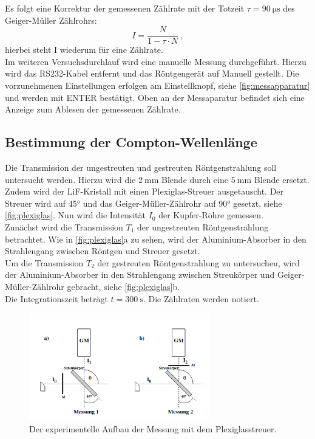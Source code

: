 \noindent Es folgt eine Korrektur der gemessenen Zählrate mit der Totzeit $\tau = \SI{90}{\micro\second}$ des Geiger-Müller Zählrohrs:
\begin{equation}\label{eqn:korrektur}
    I = \frac{N}{1 - \tau \cdot N} \, ,
\end{equation}
hierbei steht I wiederum für eine Zählrate.\\

\noindent
Im weiteren Versuchsdurchlauf wird eine manuelle Messung durchgeführt.
Hierzu wird das RS232-Kabel entfernt und das Röntgengerät auf Manuell gestellt.
Die vorzunehmenen Einstellungen erfolgen am Einstellknopf, siehe \autoref{fig:messapparatur} und werden mit ENTER bestätigt.
Oben an der Messaparatur befindet sich eine Anzeige zum Ablesen der gemessenen Zählrate.

\subsection{Bestimmung der Compton-Wellenlänge}
Die Transmission der ungestreuten und gestreuten Röntgenstrahlung soll untersucht werden.
Hierzu wird die $\SI{2}{\milli\metre}$ Blende durch eine $\SI{5}{\milli\metre}$ Blende ersetzt.
Zudem wird der LiF-Kristall mit einen Plexiglas-Streuer ausgetauscht.
Der Streuer wird auf 45° und das Geiger-Müller-Zählrohr auf 90° gesetzt, siehe \autoref{fig:plexiglas}.
Nun wird die Intensität $I_0$ der Kupfer-Röhre gemessen. \\
\noindent
Zunächst wird die Transmission $T_1$ der ungestreuten Röntgenstrahlung betrachtet.
Wie in \autoref{fig:plexiglas}a zu sehen, wird der Aluminium-Absorber in den Strahlengang zwischen Röntgen und Streuer gesetzt. \\
\noindent
Um die Transmission $T_2$ der gestreuten Röntgenstrahlung zu untersuchen, wird der Aluminium-Absorber in den Strahlengang zwischen Streukörper und Geiger-Müller-Zählrohr gebracht,
siehe \autoref{fig:plexiglas}b. \\
Die Integrationszeit beträgt $t = \SI{300}{\second}$.
Die Zählraten werden notiert.

\begin{figure}
    \centering
    \includegraphics[width=0.7\textwidth]{bilder/plexiglas_aufbau.png}
    \caption{Der experimentelle Aufbau der Messung mit dem Plexiglasstreuer. \cite{anleitung} }
    \label{fig:plexiglas}
\end{figure}